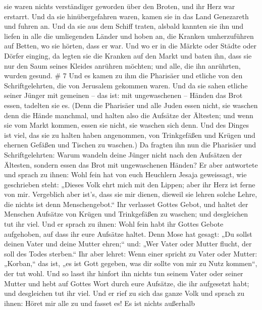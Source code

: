 sie waren nichts verständiger geworden über den Broten, und ihr Herz war
erstarrt.  Und da sie hinübergefahren waren, kamen sie in
das Land Genezareth und fuhren an.  Und da sie aus dem
Schiff traten, alsbald kannten sie ihn  und liefen in alle
die umliegenden Länder und hoben an, die Kranken umherzuführen auf
Betten, wo sie hörten, dass er war.  Und wo er in die
Märkte oder Städte oder Dörfer einging, da legten sie die Kranken auf
den Markt und baten ihn, dass sie nur den Saum seines Kleides anrühren
möchten; und alle, die ihn anrührten, wurden gesund. \# 7 
Und es kamen zu ihm die Pharisäer und etliche von den Schriftgelehrten,
die von Jerusalem gekommen waren.  Und da sie sahen etliche
seiner Jünger mit gemeinen -- das ist: mit ungewaschenen -- Händen das
Brot essen, tadelten sie es.  (Denn die Pharisäer und alle
Juden essen nicht, sie waschen denn die Hände manchmal, und halten also
die Aufsätze der Ältesten;  und wenn sie vom Markt kommen,
essen sie nicht, sie waschen sich denn. Und des Dinges ist viel, das sie
zu halten haben angenommen, von Trinkgefäßen und Krügen und ehernen
Gefäßen und Tischen zu waschen.)  Da fragten ihn nun die
Pharisäer und Schriftgelehrten: Warum wandeln deine Jünger nicht nach
den Aufsätzen der Ältesten, sondern essen das Brot mit ungewaschenen
Händen?  Er aber antwortete und sprach zu ihnen: Wohl fein
hat von euch Heuchlern Jesaja geweissagt, wie geschrieben steht: „Dieses
Volk ehrt mich mit den Lippen; aber ihr Herz ist ferne von mir.
 Vergeblich aber ist's, dass sie mir dienen, dieweil sie
lehren solche Lehre, die nichts ist denn Menschengebot.`` 
Ihr verlasset Gottes Gebot, und haltet der Menschen Aufsätze von Krügen
und Trinkgefäßen zu waschen; und desgleichen tut ihr viel. 
Und er sprach zu ihnen: Wohl fein habt ihr Gottes Gebote aufgehoben, auf
dass ihr eure Aufsätze haltet.  Denn Mose hat gesagt: „Du
sollst deinen Vater und deine Mutter ehren;`` und: „Wer Vater oder
Mutter flucht, der soll des Todes sterben.``  Ihr aber
lehret: Wenn einer spricht zu Vater oder Mutter: „Korban,`` das ist, „es
ist Gott gegeben, was dir sollte von mir zu Nutz kommen``, der tut wohl.
 Und so lasst ihr hinfort ihn nichts tun seinem Vater oder
seiner Mutter  und hebt auf Gottes Wort durch eure
Aufsätze, die ihr aufgesetzt habt; und desgleichen tut ihr viel.
 Und er rief zu sich das ganze Volk und sprach zu ihnen:
Höret mir alle zu und fasset es!  Es ist nichts außerhalb

